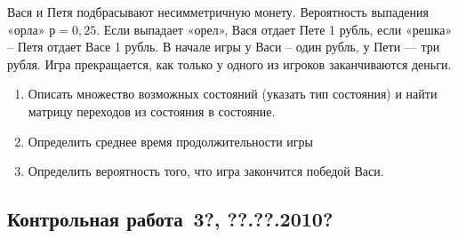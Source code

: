 \documentclass[pdftex,12pt,a4paper]{article}
\begin{document}
Вася и Петя подбрасывают несимметричную монету. Вероятность выпадения «орла» $р=0,25$. Если выпадает «орел», Вася отдает Пете 1 рубль, если «решка» -- Петя отдает Васе 1 рубль. В начале игры у Васи -- один рубль, у Пети --- три рубля. Игра прекращается, как только у одного из игроков заканчиваются деньги. 
\begin{enumerate}
\item Описать множество возможных состояний (указать тип состояния) и найти матрицу переходов из состояния в состояние.
\item Определить среднее время продолжительности игры
\item Определить вероятность того, что игра закончится победой Васи.
\end{enumerate}

\subsection{Контрольная работа \No\,3?, ??.??.2010?}
\end{document}
